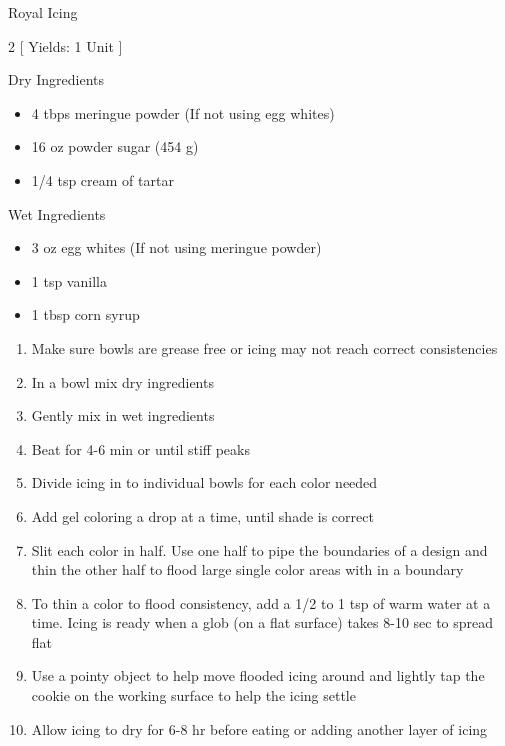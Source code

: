\begin{Large}
    Royal Icing
\end{Large}

\begin{scriptsize}
\begin{multicols}{2}
[
\vspace{1em}
Yields: 1 Unit
\vspace{-1.5em}
]

Dry Ingredients
\begin{itemize}
    \item 4 tbps meringue powder (If not using egg whites)
    \item 16 oz powder sugar (454 g)
    \item 1/4 tsp cream of tartar
\end{itemize}

Wet Ingredients
\begin{itemize}
    \item 3 oz egg whites (If not using meringue powder)
    \item 1 tsp vanilla
    \item 1 tbsp corn syrup
\end{itemize}
\end{multicols}
\end{scriptsize}

\begin{footnotesize}
\begin{enumerate}
    \item Make sure bowls are grease free or icing may not reach correct consistencies 
    \item In a bowl mix dry ingredients
    \item Gently mix in wet ingredients
    \item Beat for 4-6 min or until stiff peaks
    \item Divide icing in to individual bowls for each color needed
    \item Add gel coloring a drop at a time, until shade is correct
    \item Slit each color in half. Use one half to pipe the boundaries of a design and thin the other half to flood large single color areas with in a boundary
    \item To thin a color to flood consistency, add a 1/2 to 1 tsp of warm water at a time. Icing is ready when a glob (on a flat surface) takes 8-10 sec to spread flat
    \item Use a pointy object to help move flooded icing around and lightly tap the cookie on the working surface to help the icing settle
    \item Allow icing to dry for 6-8 hr before eating or adding another layer of icing
\end{enumerate}
\end{footnotesize}

\vspace{2em}
